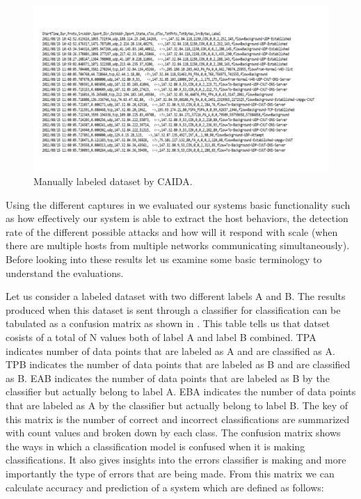 \begin{figure}[t]
	\centerline{\includegraphics[trim=4cm 3cm 3cm 3cm, scale = 0.5]{ss_labeled.pdf}}
	\caption{Manually labeled dataset by CAIDA.}%
\end{figure}

	

Using the different captures in   we evaluated our systems basic functionality such as how effectively our system is able to extract the host behaviors, the detection rate of the different possible attacks and how will it respond with scale (when there are multiple hosts from multiple networks communicating simultaneously). Before looking into these results let us examine some basic terminology to understand the evaluations.

Let us consider a labeled dataset with two different labels A and B. The results produced when this dataset is sent through a classifier for classification can be tabulated as a confusion matrix as shown in . This table tells us that datset cosists of a total of N values both of label A and label B combined. TPA indicates number of data points that are labeled as A and are classified as A. TPB indicates the number of data points that are labeled as B and are classified as B. EAB indicates the number of data points that are labeled as B by the classifier but actually belong to label A. EBA indicates the number of data points that are labeled as A by the classifier but actually belong to label B. The key of this matrix is the number of correct and incorrect classifications are summarized with count values and broken down by each class. The confusion matrix shows the ways in which a classification model is confused when it is making classifications. It also gives insights into the errors classifier is making and more importantly the type of errors that are being made. From this matrix we can calculate accuracy and prediction of a system which are defined as follows:

